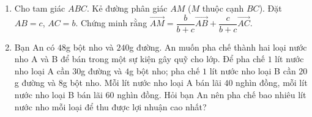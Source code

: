 \begin{bt}%
	\begin{enumerate}
		\item Cho tam giác $ABC$. Kẻ đường phân giác $AM$ ($M$ thuộc cạnh $BC$). Đặt $AB=c$, $AC=b$. Chứng minh rằng $\overrightarrow{AM}=\dfrac{b}{b+c}\overrightarrow{AB}+\dfrac{c}{b+c}\overrightarrow{AC}$.
		\item Bạn An có $48$g bột nho và $240$g đường. An muốn pha chế thành hai loại nước nho A và B để bán trong một sự kiện gây quỹ cho lớp. Để pha chế $1$ lít nước nho loại A cần $30$g đường và $4$g bột nho; pha chế $1$ lít nước nho loại B cần $20$g đường và $8$g bột nho. Mỗi lít nước nho loại A bán lãi $40$ nghìn đồng, mỗi lít nước nho loại B bán lãi $60$ nghìn đồng. Hỏi bạn An nên pha chế bao nhiêu lít nước nho mỗi loại để thu được lợi nhuận cao nhất?
	\end{enumerate}
\end{bt}
